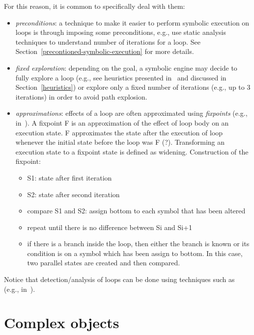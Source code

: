 For this reason, it is common to specifically deal with them:
\begin{itemize}

  \item {\em preconditions}: a technique to make it easier to perform symbolic execution on loops is through imposing some preconditions, e.g., use static analysis techniques to understand number of iterations for a loop. See Section~\ref{precontioned-symbolic-execution} for more details.

  \item {\em fixed exploration}: depending on the goal, a symbolic engine may decide to fully explore a loop (e.g., see heuristics presented in~\cite{AEG-NDSS11} and discussed in Section~\ref{heuristics}) or explore only a fixed number of iterations (e.g., up to 3 iterations) in order to avoid path explosion.

  \item {\em approximations}: effects of a loop are often approximated using {\em fixpoints} (e.g., in~\cite{KKM-USEC05,BNS-SP06,CFB-ACSAC06}). A fixpoint F is an approximation of the effect of loop body on an execution state. F approximates the state after the execution of loop whenever the initial state before the loop was F (?). Transforming an execution state to a fixpoint state is defined as widening. Construction of the fixpoint:
  \begin{itemize}
    \item S1: state after first iteration
    \item S2: state after second iteration
    \item compare S1 and S2: assign bottom to each symbol that has been altered
    \item repeat until there is no difference between Si and Si+1
    \item if there is a branch inside the loop, then either the branch is known or its condition is on a symbol which has been assign to bottom. In this case, two parallel states are created and then compared.
  \end{itemize}

\end{itemize}

Notice that detection/analysis of loops can be done using techniques such as~\cite{SGL-TOPLAS96} (e.g., in~\cite{CFB-ACSAC06}).


\section{Complex objects}

